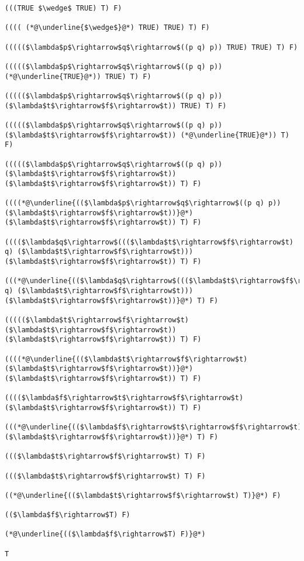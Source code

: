 \lstset{basicstyle=\ttfamily\small}\lstset{numbers=none}\lstset{language=ML}\begin{lstlisting}
(((TRUE $\wedge$ TRUE) T) F)

(((( (*@\underline{$\wedge$}@*) TRUE) TRUE) T) F)

((((($\lambda$p$\rightarrow$q$\rightarrow$((p q) p)) TRUE) TRUE) T) F)

((((($\lambda$p$\rightarrow$q$\rightarrow$((p q) p)) (*@\underline{TRUE}@*)) TRUE) T) F)

((((($\lambda$p$\rightarrow$q$\rightarrow$((p q) p)) ($\lambda$t$\rightarrow$f$\rightarrow$t)) TRUE) T) F)

((((($\lambda$p$\rightarrow$q$\rightarrow$((p q) p)) ($\lambda$t$\rightarrow$f$\rightarrow$t)) (*@\underline{TRUE}@*)) T) F)

((((($\lambda$p$\rightarrow$q$\rightarrow$((p q) p)) ($\lambda$t$\rightarrow$f$\rightarrow$t)) ($\lambda$t$\rightarrow$f$\rightarrow$t)) T) F)

((((*@\underline{(($\lambda$p$\rightarrow$q$\rightarrow$((p q) p)) ($\lambda$t$\rightarrow$f$\rightarrow$t))}@*) ($\lambda$t$\rightarrow$f$\rightarrow$t)) T) F)

(((($\lambda$q$\rightarrow$((($\lambda$t$\rightarrow$f$\rightarrow$t) q) ($\lambda$t$\rightarrow$f$\rightarrow$t))) ($\lambda$t$\rightarrow$f$\rightarrow$t)) T) F)

(((*@\underline{(($\lambda$q$\rightarrow$((($\lambda$t$\rightarrow$f$\rightarrow$t) q) ($\lambda$t$\rightarrow$f$\rightarrow$t))) ($\lambda$t$\rightarrow$f$\rightarrow$t))}@*) T) F)

((((($\lambda$t$\rightarrow$f$\rightarrow$t) ($\lambda$t$\rightarrow$f$\rightarrow$t)) ($\lambda$t$\rightarrow$f$\rightarrow$t)) T) F)

((((*@\underline{(($\lambda$t$\rightarrow$f$\rightarrow$t) ($\lambda$t$\rightarrow$f$\rightarrow$t))}@*) ($\lambda$t$\rightarrow$f$\rightarrow$t)) T) F)

(((($\lambda$f$\rightarrow$t$\rightarrow$f$\rightarrow$t) ($\lambda$t$\rightarrow$f$\rightarrow$t)) T) F)

(((*@\underline{(($\lambda$f$\rightarrow$t$\rightarrow$f$\rightarrow$t) ($\lambda$t$\rightarrow$f$\rightarrow$t))}@*) T) F)

((($\lambda$t$\rightarrow$f$\rightarrow$t) T) F)

((($\lambda$t$\rightarrow$f$\rightarrow$t) T) F)

((*@\underline{(($\lambda$t$\rightarrow$f$\rightarrow$t) T)}@*) F)

(($\lambda$f$\rightarrow$T) F)

(*@\underline{(($\lambda$f$\rightarrow$T) F)}@*)

T
\end{lstlisting}
	

